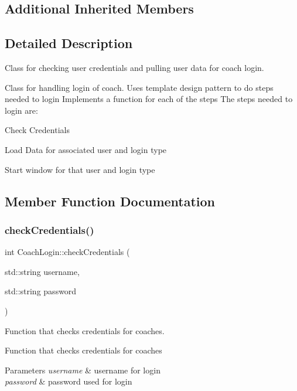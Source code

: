 \subsection*{Additional Inherited Members}


\subsection{Detailed Description}
Class for checking user credentials and pulling user data for coach login. 

Class for handling login of coach. Uses template design pattern to do steps needed to login Implements a function for each of the steps The steps needed to login are\+:
\begin{DoxyEnumerate}
\item Check Credentials
\item Load Data for associated user and login type
\item Start window for that user and login type 
\end{DoxyEnumerate}

\subsection{Member Function Documentation}
\mbox{\label{classCoachLogin_a68ad4e904820d7a95d842e159fbc9edc}} 
\subsubsection{\texorpdfstring{checkCredentials()}{checkCredentials()}}
{\footnotesize\ttfamily int Coach\+Login\+::check\+Credentials (\begin{DoxyParamCaption}\item[{std\+::string}]{username,  }\item[{std\+::string}]{password }\end{DoxyParamCaption})\hspace{0.3cm}{\ttfamily [virtual]}}



Function that checks credentials for coaches. 

Function that checks credentials for coaches 
\begin{DoxyParams}{Parameters}
{\em username} & username for login \\
\hline
{\em password} & password used for login \\
\hline
\end{DoxyParams}


